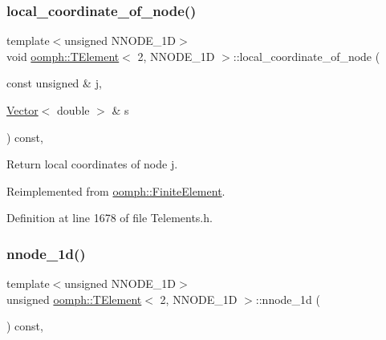 \subsubsection{\texorpdfstring{local\+\_\+coordinate\+\_\+of\+\_\+node()}{local\_coordinate\_of\_node()}}
{\footnotesize\ttfamily template$<$unsigned N\+N\+O\+D\+E\+\_\+1D$>$ \\
void \hyperlink{classoomph_1_1TElement}{oomph\+::\+T\+Element}$<$ 2, N\+N\+O\+D\+E\+\_\+1D $>$\+::local\+\_\+coordinate\+\_\+of\+\_\+node (\begin{DoxyParamCaption}\item[{const unsigned \&}]{j,  }\item[{\hyperlink{classoomph_1_1Vector}{Vector}$<$ double $>$ \&}]{s }\end{DoxyParamCaption}) const\hspace{0.3cm}{\ttfamily [inline]}, {\ttfamily [virtual]}}



Return local coordinates of node j. 



Reimplemented from \hyperlink{classoomph_1_1FiniteElement_a22bc4ee35e4f948d8d7fba18c7b4f4c4}{oomph\+::\+Finite\+Element}.



Definition at line 1678 of file Telements.\+h.

\mbox{\label{classoomph_1_1TElement_3_012_00_01NNODE__1D_01_4_accd8f7c31e1d98bb33d186a01c9e5ad6}} 
\subsubsection{\texorpdfstring{nnode\+\_\+1d()}{nnode\_1d()}}
{\footnotesize\ttfamily template$<$unsigned N\+N\+O\+D\+E\+\_\+1D$>$ \\
unsigned \hyperlink{classoomph_1_1TElement}{oomph\+::\+T\+Element}$<$ 2, N\+N\+O\+D\+E\+\_\+1D $>$\+::nnode\+\_\+1d (\begin{DoxyParamCaption}{ }\end{DoxyParamCaption}) const\hspace{0.3cm}{\ttfamily [inline]}, {\ttfamily [virtual]}}



